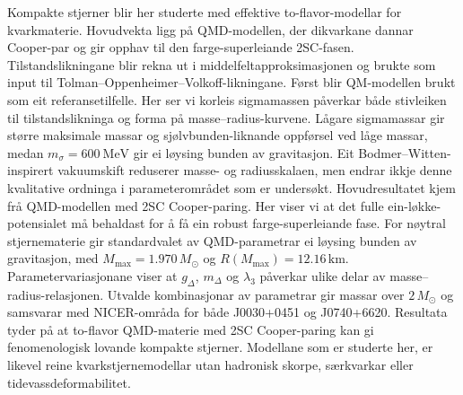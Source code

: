 Kompakte stjerner blir her studerte med effektive to-flavor-modellar for
kvarkmaterie. Hovudvekta ligg på QMD-modellen, der dikvarkane dannar
Cooper-par og gir opphav til den farge-superleiande 2SC-fasen.
Tilstandslikningane blir rekna ut i middelfeltapproksimasjonen og brukte som
input til Tolman--Oppenheimer--Volkoff-likningane.
Først blir QM-modellen brukt som eit referansetilfelle. Her ser vi korleis
sigmamassen påverkar både stivleiken til tilstandslikninga og forma på
masse--radius-kurvene. Lågare sigmamassar gir større maksimale massar og
sjølvbunden-liknande oppførsel ved låge massar, medan
\(m_\sigma=600~\mathrm{MeV}\) gir ei løysing bunden av gravitasjon. Eit
Bodmer--Witten-inspirert vakuumskift reduserer masse- og radiusskalaen, men
endrar ikkje denne kvalitative ordninga i parameterområdet som er undersøkt.
Hovudresultatet kjem frå QMD-modellen med 2SC Cooper-paring. Her viser vi at
det fulle ein-løkke-potensialet må behaldast for å få ein robust
farge-superleiande fase. For nøytral stjernematerie gir standardvalet av
QMD-parametrar ei løysing bunden av gravitasjon, med
\(M_{\max}=1.970\,M_\odot\) og \(R(M_{\max})=12.16\,\mathrm{km}\).
Parametervariasjonane viser at \(g_\Delta\), \(m_\Delta\) og \(\lambda_3\)
påverkar ulike delar av masse--radius-relasjonen. Utvalde kombinasjonar av
parametrar gir massar over \(2\,M_\odot\) og samsvarar med NICER-områda for
både J0030+0451 og J0740+6620. Resultata tyder på at to-flavor QMD-materie med
2SC Cooper-paring kan gi fenomenologisk lovande kompakte stjerner. Modellane
som er studerte her, er likevel reine kvarkstjernemodellar utan hadronisk
skorpe, særkvarkar eller tidevassdeformabilitet.